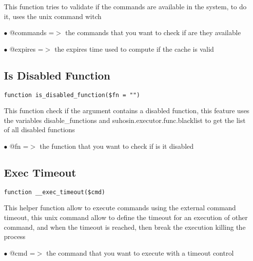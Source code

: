 \documentclass[a4paper]{book}
\begin{document}
This function tries to validate if the commands are available
in the system, to do it, uses the unix command witch

\begin{compactitem}
\item[\color{myblue}$\bullet$] @commands =$>$ the commands that you want to check if are they available
\item[\color{myblue}$\bullet$] @expires  =$>$ the expires time used to compute if the cache is valid
\end{compactitem}

\hypertarget{toc111}{}
\subsection{Is Disabled Function}

\begin{lstlisting}
function is_disabled_function($fn = "")
\end{lstlisting}

This function check if the argument contains a disabled
function, this feature uses the variables disable\_functions
and suhosin.executor.func.blacklist to get the list of all
disabled functions

\begin{compactitem}
\item[\color{myblue}$\bullet$] @fn =$>$ the function that you want to check if is it disabled
\end{compactitem}

\hypertarget{toc112}{}
\subsection{Exec Timeout}

\begin{lstlisting}
function __exec_timeout($cmd)
\end{lstlisting}

This helper function allow to execute commands using the external
command timeout, this unix command allow to define the timeout for
an execution of other command, and when the timeout is reached, then
break the execution killing the process

\begin{compactitem}
\item[\color{myblue}$\bullet$] @cmd =$>$ the command that you want to execute with a timeout control
\end{compactitem}
\end{document}
